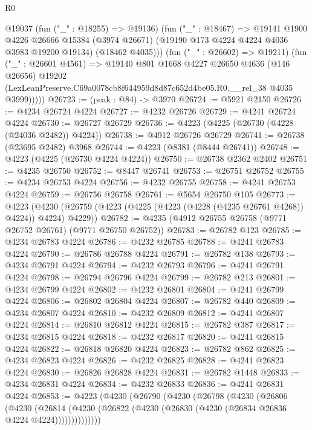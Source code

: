 \begin{lexlean}{R0}
\begin{coremodule}
            @19037
            (fun ("_" : @18255) => @19136)
            (fun ("_" : @18467) =>
            @19141
              @1900
              @4226
              @26666
              @15384
              (@3974 @26671)
              (@19190 @173 @4224 @4224 @4036 @3983 @19200 @19134)
              (@18462 @4035)))
          (fun ("_" : @26602) => @19211)
          (fun ("_" : @26601 @4561) =>
          @19140
            @801
            @1668
            @4227
            @26650
            @4636
            (@146 @26656)
            @19202
            (LexLeanPreserve.C69a0078cb8f644959d8d87c652d4be05.R0.__rel_38 @4035 @3999)))))
@26723 := (peak : @84) -> @3970
@26724 := @5921 @2150
@26726 := @4234 @26724 @4224
@26727 := @4232 @26726
@26729 := @4241 @26724 @4224
@26730 := @26727 @26729
@26736 := @4223 (@4225 (@26730 (@4228 (@24036 @2482)) @4224))
@26738 := @4912 @26726 @26729
@26741 := @26738 (@23695 @2482) @3968
@26744 := @4223 (@8381 (@8444 @26741))
@26748 := @4223 (@4225 (@26730 @4224 @4224))
@26750 := @26738 @2362 @2402
@26751 := @4235 @26750
@26752 := @8447 @26741
@26753 := @26751 @26752
@26755 := @4234 @26753 @4224
@26756 := @4232 @26755
@26758 := @4241 @26753 @4224
@26759 := @26756 @26758
@26761 := @5654 @26750 @105
@26773 := @4223
    (@4230 (@26759 (@4223 (@4225 (@4223 (@4228 (@4235 @26761 @4268)) @4224)) @4224) @4229))
@26782 := @4235 (@4912 @26755 @26758 (@9771 @26752 @26761) (@9771 @26750 @26752))
@26783 := @26782 @123
@26785 := @4234 @26783 @4224
@26786 := @4232 @26785
@26788 := @4241 @26783 @4224
@26790 := @26786 @26788 @4224
@26791 := @26782 @138
@26793 := @4234 @26791 @4224
@26794 := @4232 @26793
@26796 := @4241 @26791 @4224
@26798 := @26794 @26796 @4224
@26799 := @26782 @213
@26801 := @4234 @26799 @4224
@26802 := @4232 @26801
@26804 := @4241 @26799 @4224
@26806 := @26802 @26804 @4224
@26807 := @26782 @440
@26809 := @4234 @26807 @4224
@26810 := @4232 @26809
@26812 := @4241 @26807 @4224
@26814 := @26810 @26812 @4224
@26815 := @26782 @387
@26817 := @4234 @26815 @4224
@26818 := @4232 @26817
@26820 := @4241 @26815 @4224
@26822 := @26818 @26820 @4224
@26823 := @26782 @862
@26825 := @4234 @26823 @4224
@26826 := @4232 @26825
@26828 := @4241 @26823 @4224
@26830 := @26826 @26828 @4224
@26831 := @26782 @1448
@26833 := @4234 @26831 @4224
@26834 := @4232 @26833
@26836 := @4241 @26831 @4224
@26853 := @4223
    (@4230
      (@26790
        (@4230
          (@26798
            (@4230
              (@26806
                (@4230
                  (@26814
                    (@4230 (@26822 (@4230 (@26830 (@4230 (@26834 @26836 @4224 @4224))))))))))))))

\end{coremodule}
\end{lexlean}
